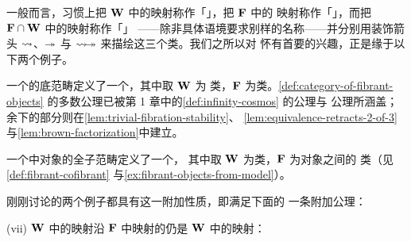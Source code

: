 一般而言，习惯上把 $\mathbf{W}$ 中的映射称作「\trWeakEquivalence」，把 $\mathbf{F}$ 中的
映射称作「\trFibration」，而把 $\mathbf{F}\cap\mathbf{W}$ 中的映射称作「\trTrivialFibration」
——除非具体语境要求别样的名称——并分别用装饰箭头
$\rightsquigarrow$、$\twoheadrightarrow$ 与 $\rvTFarrow$ 来描绘这三个类。我们之所以对%
\trCategoryOfFibrantObjects{}怀有首要的兴趣，正是缘于以下两个例子。

\begin{example}\label{exa:cosmos-as-fibrant-objects}
一个\trInfinityCosmos{}的底范畴定义了一个\trCategoryOfFibrantObjects，其中取 $\mathbf{W}$ 为%
\trEquivalence{}类，$\mathbf{F}$ 为\trIsofibration{}类。\cref{def:category-of-fibrant-objects}
的多数公理已被第 1 章中的\cref{def:infinity-cosmos} 的\trLimit{}公理与%
\trIsofibration{}公理所涵盖；余下的部分则在\cref{lem:trivial-fibration-stability}、%
\cref{lem:equivalence-retracts-2-of-3} 与\cref{lem:brown-factorization}中建立。
\end{example}

\begin{example}\label{exa:model-category-fibrant-objects}
一个\trModelCategory{}中\trFibrant{}对象的全子范畴定义了一个\trCategoryOfFibrantObjects，
其中取 $\mathbf{W}$ 为\trWeakEquivalence{}类，$\mathbf{F}$ 为\trFibrant{}对象之间的%
\trFibration{}类（见\cref{def:fibrant-cofibrant} 与\cref{ex:fibrant-objects-from-model}）。
\end{example}

\begin{remark}\label{rem:right-proper}
刚刚讨论的两个例子都具有\textbf{\trRightProper}这一附加性质，即满足下面的%
一条附加公理：

(vii) $\mathbf{W}$ 中的映射沿 $\mathbf{F}$ 中映射的\trPullback{}仍是 $\mathbf{W}$ 中的映射：
\begin{center}
\end{center}
\end{remark}


